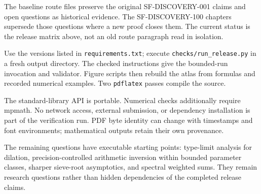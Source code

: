The baseline route files preserve the original SF-DISCOVERY-001 claims and
open questions as historical evidence. The SF-DISCOVERY-100 chapters supersede
those questions where a new proof closes them. The current status is the
release matrix above, not an old route paragraph read in isolation.

Use the versions listed in \texttt{requirements.txt}; execute
\texttt{checks/run\_release.py} in a fresh output directory. The checked
instructions give the bounded-run invocation and validator. Figure scripts
then rebuild the atlas from formulas and recorded numerical examples.
Two \texttt{pdflatex} passes compile the source.

The standard-library API is portable. Numerical checks additionally require
mpmath. No network access, external submission, or dependency installation is
part of the verification run. PDF byte identity can change with timestamps
and font environments; mathematical outputs retain their own provenance.

The remaining questions have executable starting points: type-limit analysis
for dilation, precision-controlled arithmetic inversion within bounded
parameter classes, sharper sieve-root asymptotics, and spectral weighted sums.
They remain research questions rather than hidden dependencies of the
completed release claims.
